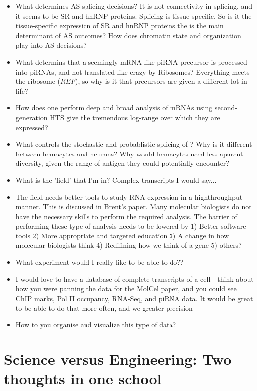 \begin{itemize}
	\item What determines AS splicing decisions? It is not connectivity in splicing, and it seems to be SR and hnRNP proteins. Splicing is tissue specific. So is it the tissue-specific expression of SR and hnRNP proteins the is the main determinant of AS outcomes? How does chromatin state and organization play into AS decisions? 
	\item What determins that a seemingly mRNA-like piRNA precursor is processed into piRNAs, and not translated like crazy by Ribosomes?  Everything meets the ribosome ($REF$), so why is it that precursors are given a different lot in life?
	\item How does one perform deep and broad analysis of mRNAs using second-generation HTS give the tremendous log-range over which they are expressed?
	\item What controls the stochastic and probablistic splicing of \dscam{}? Why is it different between hemocytes and neurons? Why would hemocytes need less aparent diversity, given the range of antigen they could potentially encounter?
	\item What is the 'field' that I'm in? Complex transcripts I would say... 
	\item The field needs better tools to study RNA expression in a highthroughput manner. This is discussed in Brent's paper. Many molecular biologists do not have the necessary skills to perform the required analysis. The barrier of performing these type of analysis needs to be lowered by 1) Better software tools 2) More appropriate and targeted education 3) A change in how molecular biologists think 4) Redifining how we think of a gene 5) others?
	\item What experiment would I really like to be able to do??
	\item I would love to have a database of complete transcripts of a cell - think about how you were panning the data for the MolCel paper, and you could see ChIP marks, Pol II occupancy, RNA-Seq, and piRNA data. It would be great to be able to do that more often, and we greater precision
	\item How to you organise and visualize this type of data?
\end{itemize}

\section{Science versus Engineering: Two thoughts in one school}

